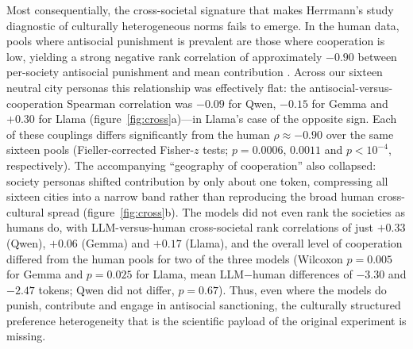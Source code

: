 Most consequentially, the cross-societal signature that makes Herrmann's study diagnostic of culturally heterogeneous norms fails to emerge. In the human data, pools where antisocial punishment is prevalent are those where cooperation is low, yielding a strong negative rank correlation of approximately $-0.90$ between per-society antisocial punishment and mean contribution \cite{herrmann2008antisocial}. Across our sixteen neutral city personas this relationship was effectively flat: the antisocial-versus-cooperation Spearman correlation was $-0.09$ for Qwen, $-0.15$ for Gemma and $+0.30$ for Llama (figure~\ref{fig:cross}a)---in Llama's case of the opposite sign. Each of these couplings differs significantly from the human $\rho\approx-0.90$ over the same sixteen pools (Fieller-corrected Fisher-$z$ tests; $p=0.0006$, $0.0011$ and $p<10^{-4}$, respectively). The accompanying ``geography of cooperation'' also collapsed: society personas shifted contribution by only about one token, compressing all sixteen cities into a narrow band rather than reproducing the broad human cross-cultural spread (figure~\ref{fig:cross}b). The models did not even rank the societies as humans do, with LLM-versus-human cross-societal rank correlations of just $+0.33$ (Qwen), $+0.06$ (Gemma) and $+0.17$ (Llama), and the overall level of cooperation differed from the human pools for two of the three models (Wilcoxon $p=0.005$ for Gemma and $p=0.025$ for Llama, mean LLM$-$human differences of $-3.30$ and $-2.47$ tokens; Qwen did not differ, $p=0.67$). Thus, even where the models do punish, contribute and engage in antisocial sanctioning, the culturally structured preference heterogeneity that is the scientific payload of the original experiment is missing.
